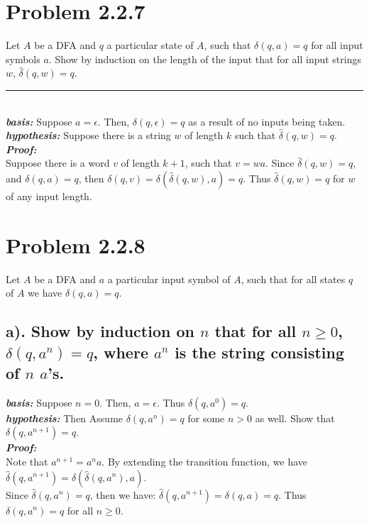 \documentclass[20pt]{article} %
\begin{document}
\section{Problem 2.2.7}
Let $A$ be a DFA and $q$ a particular state of $A$, such that $\delta(q,a)=q$ for all input symbols $a$. 
Show by induction on the length of the input that for all input strings $w$, $\hat{\delta}(q,w)=q$. \\
\noindent\rule{2cm}{0.4pt} \\

\textbf{\textit{basis:}} Suppose $a = \epsilon$. Then, $\delta(q,\epsilon)=q$ as a result of no inputs being taken. \\
\textbf{\textit{hypothesis:}} Suppose there is a string $w$ of length $k$ such that  $\hat{\delta}(q,w)=q$. \\

\textbf{\textit{Proof:}} \\
Suppose there is a word $v$ of length $k+1$, such that $v = wa$.  Since $\hat{\delta}(q,w)=q$, and $\delta(q,a)=q$, then $\delta(q,v)=\delta(\hat{\delta}(q,w), a)=q$. Thus $\hat{\delta}(q,w)=q$ for $w$ of any input length.


\section{Problem 2.2.8}
Let $A$ be a DFA and $a$ a particular input symbol of $A$, such that for all states $q$ of $A$ we have $\delta(q,a)=q$.

\subsection{a). Show by induction on $n$ that for all $n\geq0$, $\delta(q,a^{n})=q$, where $a^{n}$ is the string consisting of $n$ $a$'s.} 

\textbf{\textit{basis:}} Suppose $n = 0$. Then, $a = \epsilon$. Thus $\delta(q,a^{0})=q$. \\
\textbf{\textit{hypothesis:}} Then Assume $\delta(q,a^{n})=q$ for some $n > 0$ as well. Show that $\delta(q,a^{n+1})=q$. \\ 

\textbf{\textit{Proof:}} \\
Note that $a^{n+1} = a^{n}a$.  By extending the transition function, we have $\hat{\delta}(q,a^{n+1})=\delta(\hat{\delta}(q,a^{n}), a).$ \\
Since $\hat{\delta}(q,a^{n}) = q$, then we have: $\hat{\delta}(q,a^{n+1})=\delta(q, a)=q$. Thus $\delta(q,a^{n})=q$ for all $n \geq 0$.
\end{document}
